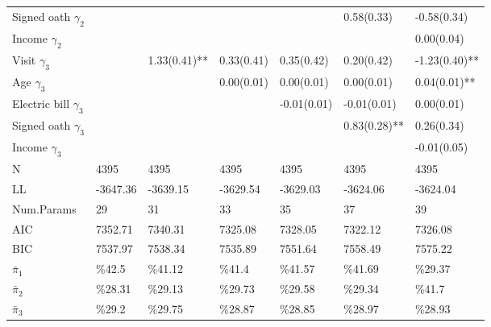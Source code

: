 \begin{tabular}{lllllll}
  Signed oath $\gamma_{2}$ &  &  &  &  &  0.58(0.33)    & -0.58(0.34)    \\ 
  Income $\gamma_{2}$ &  &  &  &  &  &  0.00(0.04)    \\ 
  Visit $\gamma_{3}$ &  &  1.33(0.41)**  &  0.33(0.41)    &  0.35(0.42)    &  0.20(0.42)    & -1.23(0.40)**  \\ 
  Age $\gamma_{3}$ &  &  &  0.00(0.01)    &  0.00(0.01)    &  0.00(0.01)    &  0.04(0.01)**  \\ 
  Electric bill $\gamma_{3}$ &  &  &  & -0.01(0.01)    & -0.01(0.01)    &  0.00(0.01)    \\ 
  Signed oath $\gamma_{3}$ &  &  &  &  &  0.83(0.28)**  &  0.26(0.34)    \\ 
  Income $\gamma_{3}$ &  &  &  &  &  & -0.01(0.05)    \\ 
  N & 4395 & 4395 & 4395 & 4395 & 4395 & 4395 \\ 
  LL & -3647.36 & -3639.15 & -3629.54 & -3629.03 & -3624.06 & -3624.04 \\ 
  Num.Params & 29 & 31 & 33 & 35 & 37 & 39 \\ 
  AIC & 7352.71 & 7340.31 & 7325.08 & 7328.05 & 7322.12 & 7326.08 \\ 
  BIC & 7537.97 & 7538.34 & 7535.89 & 7551.64 & 7558.49 & 7575.22 \\ 
  $\bar{\pi}_{1}$ & \%42.5 & \%41.12 & \%41.4 & \%41.57 & \%41.69 & \%29.37 \\ 
  $\bar{\pi}_{2}$ & \%28.31 & \%29.13 & \%29.73 & \%29.58 & \%29.34 & \%41.7 \\ 
  $\bar{\pi}_{3}$ & \%29.2 & \%29.75 & \%28.87 & \%28.85 & \%28.97 & \%28.93 \\ 
   \hline
\end{tabular}


